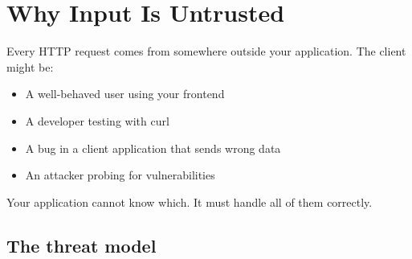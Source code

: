 \setcounter{section}{0}
\section{Why Input Is Untrusted}\label{31-input-handling:311-why-input-is-untrusted}

Every HTTP request comes from somewhere outside your application. The client might be:

\begin{itemize}
\tightlist
\item
  A well-behaved user using your frontend
\item
  A developer testing with curl
\item
  A bug in a client application that sends wrong data
\item
  An attacker probing for vulnerabilities
\end{itemize}

\noindent{}Your application cannot know which. It must handle all of them correctly.

\subsection*{The threat model}\label{31-input-handling:the-threat-model}

